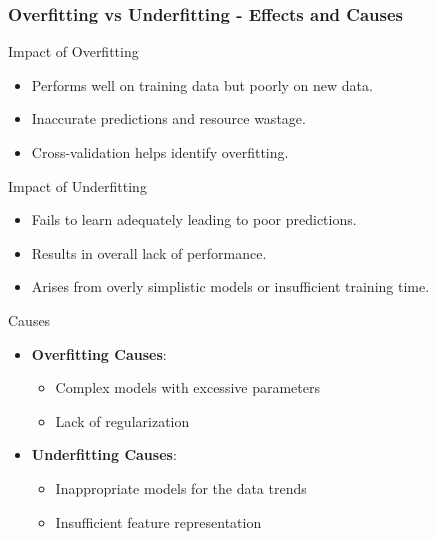 \documentclass[aspectratio=169]{beamer}
\begin{document}
\begin{frame}[fragile]
    \frametitle{Overfitting vs Underfitting - Effects and Causes}
    \begin{block}{Impact of Overfitting}
        \begin{itemize}
            \item Performs well on training data but poorly on new data.
            \item Inaccurate predictions and resource wastage.
            \item Cross-validation helps identify overfitting.
        \end{itemize}
    \end{block}
    
    \begin{block}{Impact of Underfitting}
        \begin{itemize}
            \item Fails to learn adequately leading to poor predictions.
            \item Results in overall lack of performance.
            \item Arises from overly simplistic models or insufficient training time.
        \end{itemize}
    \end{block}
    
    \begin{block}{Causes}
        \begin{itemize}
            \item \textbf{Overfitting Causes}:
                \begin{itemize}
                    \item Complex models with excessive parameters
                    \item Lack of regularization
                \end{itemize}
            \item \textbf{Underfitting Causes}:
                \begin{itemize}
                    \item Inappropriate models for the data trends
                    \item Insufficient feature representation
                \end{itemize}
        \end{itemize}
    \end{block}
\end{frame}
\end{document}
